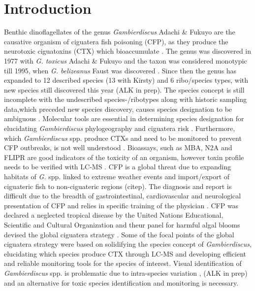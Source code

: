 \documentclass[12pt]{article}
\begin{document}
\section{Introduction}
Benthic dinoflagellates of the genus \emph{Gambierdiscus} Adachi \& Fukuyo are the causative organism of ciguatera fish poisoning (CFP), as they produce the neurotoxic ciguatoxins (CTX) which bioaccumulate \citep{chinain1997intraspecific,holmes1998gambierdiscus}. The genus was discovered in 1977 with \emph{G. toxicus} Adachi \& Fukuyo  \citep{adachi1979thecal} and the taxon was considered monotypic till 1995, when \emph{G. belizeanus} Faust was discovered \citep{faust1995observation}. Since then the genus has expanded to 12 described species (13 with Kirsty) and 6 ribo/species types, with new species still discovered this year \citep{litaker2010global,adachi1979thecal,faust1995observation,chinain1999morphology,litaker2009taxonomy,nishimura2014morphology,fraga2011gambierdiscus,xu2014distribution,fraga2014genus} (ALK in prep). The species concept is still incomplete with the undescribed species-/ribotypes along with historic sampling data,which preceded new species discovery, causes species designation to be ambiguous \citep{berdalet2012global,nishimura2014morphology}. Molecular tools are essential in determining species designation for elucidating \emph{Gambierdiscus} phylogeography  and ciguatera risk \citep{litaker2010global}. Furthermore, which \emph{Gambierdiscus} spp. produce CTXs and need to be monitored to prevent CFP outbreaks, is not well understood \citep{globalcig}. Bioassays, such as MBA, N2A and FLIPR are good indicators of the toxicity of an organism, however toxin profile needs to be verified with LC-MS \citep{diogened2014chemistry}.
CFP is a global threat due to expanding habitats of \emph{G.} spp. linked to extreme weather events and import/export of ciguateric fish to non-ciguateric regions (citep). The diagnosis and report is difficult due to the breadth of gastrointestinal, cardiovascular and neurological presentation of CFP and relies in specific training of the physician \citep{sims1987theoretical}. CFP was declared a neglected tropical disease by the United Nations Educational, Scientific and Cultural Organization and theur panel for harmful algal blooms devised the global ciguatera strategy \citep{globalcig}. Some of the focal points of the global ciguatera strategy were based on solidifying the species concept of \emph{Gambierdiscus}, elucidating which species produce CTX through LC-MS and developing efficient and reliable monitoring tools for the species of interest. Visual identification of \emph{Gambierdiscus} spp. is problematic due to intra-species variation \citep{kohli2014high}, (ALK in prep) and an alternative for toxic species identification and monitoring is necessary.\\
\end{document}

